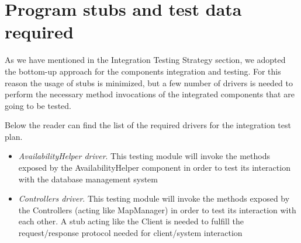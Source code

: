 \chapter{Program stubs and test data required}

As we have mentioned in the Integration Testing Strategy section, we adopted the bottom-up approach for the components integration and testing. For this reason the usage of stubs is minimized, but a few number of drivers is needed to perform the necessary method invocations of the integrated components that are going to be tested.

Below the reader can find the list of the required drivers for the integration test plan.
\begin{itemize}
	\item \emph{AvailabilityHelper driver}. This testing module will invoke the methods exposed by the AvailabilityHelper component in order to test its interaction with the database management system
	\item \emph{Controllers driver}. This testing module will invoke the methods exposed by the Controllers (acting like MapManager) in order to test its interaction with each other.
A stub acting like the Client is needed to fulfill the request/response protocol needed for client/system interaction
\end{itemize}